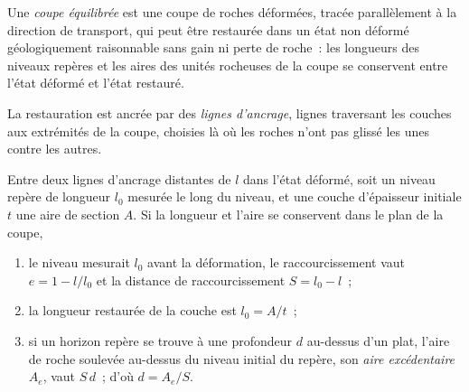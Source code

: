 \begin{definition}\label{def:b2:alpine-orogen:balanced}
Une \emph{coupe équilibrée} est une coupe de roches déformées, tracée parallèlement à la
direction de transport, qui peut être restaurée dans un état non déformé géologiquement raisonnable
sans gain ni perte de roche~: les longueurs des niveaux repères et
les aires des unités rocheuses de la coupe se conservent entre l'état déformé et l'état
restauré.
\end{definition}

La restauration est ancrée par des \emph{lignes d'ancrage}, lignes traversant les couches aux extrémités de la
coupe, choisies là où les roches n'ont pas glissé les unes contre les autres.

\begin{proposition}\label{prop:b2:alpine-orogen:balance}
Entre deux lignes d'ancrage distantes de $l$ dans l'état déformé, soit un niveau repère de
longueur $l_0$ mesurée le long du niveau, et une couche d'épaisseur initiale $t$ une aire
de section $A$. Si la longueur et l'aire se conservent dans le plan de la coupe,
\begin{enumerate}
\item le niveau mesurait $l_0$ avant la déformation, le raccourcissement vaut
$e = 1 - l/l_0$ et la distance de raccourcissement $S = l_0 - l$~;
\item la longueur restaurée de la couche est $l_0 = A/t$~;
\item si un horizon repère se trouve à une profondeur $d$ au-dessus d'un  plat, l'aire de roche
soulevée au-dessus du niveau initial du repère, son \emph{aire excédentaire} $A_e$, vaut $S\,d$~;
d'où $d = A_e/S$.
\end{enumerate}
\end{proposition}

